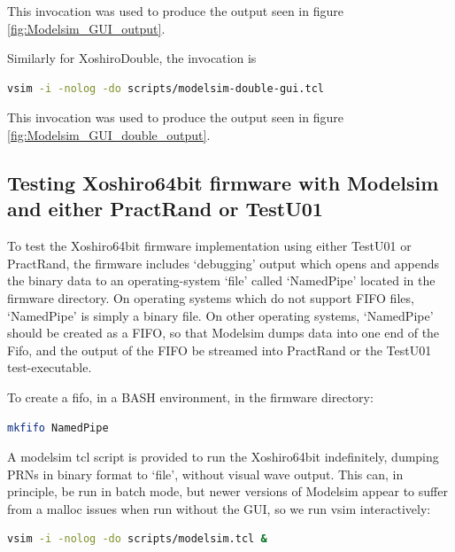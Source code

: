 \documentclass{article}
\begin{document}
This invocation was used to produce the output seen in figure \ref{fig:Modelsim_GUI_output}. 

Similarly for XoshiroDouble, the invocation is

\begin{minipage}{1.0\textwidth}
\centering
\begin{lstlisting}[language=bash , label=lst:ModelsimDoubleGui]
vsim -i -nolog -do scripts/modelsim-double-gui.tcl
\end{lstlisting}
\end{minipage}

This invocation was used to produce the output seen in figure \ref{fig:Modelsim_GUI_double_output}. 

\subsection{Testing Xoshiro64bit firmware with Modelsim and either PractRand or TestU01}

To test the Xoshiro64bit firmware implementation using either TestU01 or PractRand, the firmware includes `debugging' output which opens and appends the binary data to an operating-system `file' called `NamedPipe' located in the firmware directory. On operating systems which do not support FIFO files, `NamedPipe' is simply a binary file. On other operating systems, `NamedPipe' should be created as a FIFO, so that Modelsim dumps data into one end of the Fifo, and the output of the FIFO be streamed into PractRand or the TestU01 test-executable.

To create a fifo, in a BASH environment, in the firmware directory:

\begin{minipage}{1.0\textwidth}
\centering
\begin{lstlisting}[language=bash, label=lst:MakeFifo]
mkfifo NamedPipe
\end{lstlisting}
\end{minipage}

A modelsim tcl script is provided to run the Xoshiro64bit indefinitely, dumping PRNs in binary format to `file', without visual wave output. This can, in principle, be run in batch mode, but newer versions of Modelsim appear to suffer from a malloc issues when run without the GUI, so we run vsim interactively:

\begin{minipage}{1.0\textwidth}
\centering
\begin{lstlisting}[language=bash, label=lst:ModelsimNoGui]
vsim -i -nolog -do scripts/modelsim.tcl &
\end{lstlisting}
\end{minipage}
\end{document}
